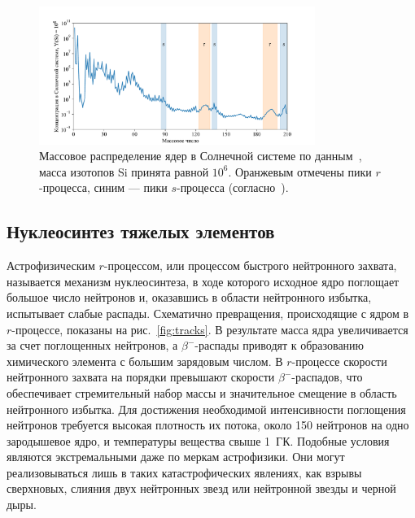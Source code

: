 \begin{figure}[!b]
  \centering
  \includegraphics[width=0.8\textwidth]{pics/lodders.pdf}
  \caption{Массовое распределение ядер в Солнечной системе по данным~\cite{lodders2003}, масса изотопов Si принята равной $10^6$. Оранжевым отмечены пики $r$-процесса, синим --- пики $s$-процесса (согласно~\cite{cowan2021}).}
  \label{fig:lodders_vs_ame}
\end{figure}

\subsection{Нуклеосинтез тяжелых элементов}
Астрофизическим $r$-процессом, или процессом быстрого нейтронного захвата, называется механизм нуклеосинтеза, в ходе которого исходное ядро поглощает большое число нейтронов и, оказавшись в области нейтронного избытка, испытывает слабые распады. Схематично превращения, происходящие с ядром в $r$-процессе, показаны на рис.~\ref{fig:tracks}. В результате масса ядра увеличивается за счет поглощенных нейтронов, а $\beta^-$-распады приводят к образованию химического элемента с большим зарядовым числом. В $r$-процессе скорости нейтронного захвата на порядки превышают скорости $\beta^-$-распадов, что обеспечивает стремительный набор массы и значительное смещение в область нейтронного избытка. Для достижения необходимой интенсивности поглощения нейтронов требуется высокая плотность их потока, около 150 нейтронов на одно зародышевое ядро, и температуры вещества свыше 1~ГК. Подобные условия являются экстремальными даже по меркам астрофизики. Они могут реализовываться лишь в таких катастрофических явлениях, как взрывы сверхновых, слияния двух нейтронных звезд или нейтронной звезды и черной дыры.

